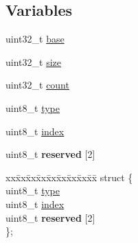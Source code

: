 \subsection*{Variables}
\begin{DoxyCompactItemize}
\item 
uint32\+\_\+t \mbox{\hyperlink{group__ftfx__controller_ga0523cedff47e2441fc198b7770ec5d3f}{base}}
\item 
uint32\+\_\+t \mbox{\hyperlink{group__ftfx__controller_gab2c6b258f02add8fdf4cfc7c371dd772}{size}}
\item 
uint32\+\_\+t \mbox{\hyperlink{group__ftfx__controller_ga86988a65e0d3ece7990c032c159786d6}{count}}
\item 
uint8\+\_\+t \mbox{\hyperlink{group__ftfx__controller_ga1d127017fb298b889f4ba24752d08b8e}{type}}
\item 
uint8\+\_\+t \mbox{\hyperlink{group__ftfx__controller_gaae5a12e607d0f782506d9e6ec6179c64}{index}}
\item 
uint8\+\_\+t {\bfseries reserved} \mbox{[}2\mbox{]}
\item 
\mbox{\label{group__ftfx__controller_ga7b15485a641f31f22441d43ff157400d}} 
\begin{tabbing}
xx\=xx\=xx\=xx\=xx\=xx\=xx\=xx\=xx\=\kill
struct \{\\
\>uint8\_t \mbox{\hyperlink{group__ftfx__controller_ga1d127017fb298b889f4ba24752d08b8e}{type}}\\
\>uint8\_t \mbox{\hyperlink{group__ftfx__controller_gaae5a12e607d0f782506d9e6ec6179c64}{index}}\\
\>uint8\_t {\bfseries reserved} \mbox{[}2\mbox{]}\\
\}; \\


\end{tabbing}
\end{DoxyCompactItemize}
